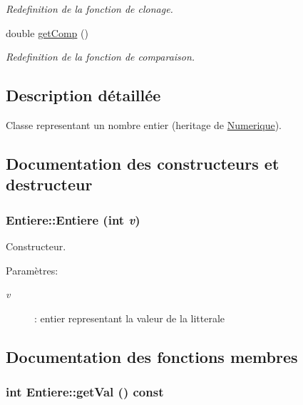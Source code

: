 \begin{CompactItemize}
\begin{CompactList}\small\item\em Redefinition de la fonction de clonage. \item\end{CompactList}\item 
\hypertarget{class_entiere_7215a91e24996f79640e766e660907cc}{
double \hyperlink{class_entiere_7215a91e24996f79640e766e660907cc}{getComp} ()}
\label{class_entiere_7215a91e24996f79640e766e660907cc}

\begin{CompactList}\small\item\em Redefinition de la fonction de comparaison. \item\end{CompactList}\end{CompactItemize}


\subsection{Description détaillée}
Classe representant un nombre entier (heritage de \hyperlink{class_numerique}{Numerique}). 

\subsection{Documentation des constructeurs et destructeur}
\hypertarget{class_entiere_ff8499408d074e26c267c2e1c6e696b8}{
\subsubsection[{Entiere}]{\setlength{\rightskip}{0pt plus 5cm}Entiere::Entiere (int {\em v})}}
\label{class_entiere_ff8499408d074e26c267c2e1c6e696b8}


Constructeur. 

\begin{Desc}
\item[Paramètres:]
\begin{description}
\item[{\em v}]: entier representant la valeur de la litterale \end{description}
\end{Desc}


\subsection{Documentation des fonctions membres}
\hypertarget{class_entiere_d2517d3ce704cca0b13cfa0ee8c24cfd}{
\subsubsection[{getVal}]{\setlength{\rightskip}{0pt plus 5cm}int Entiere::getVal () const}}
\label{class_entiere_d2517d3ce704cca0b13cfa0ee8c24cfd}


